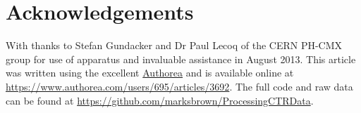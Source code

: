 \section*{Acknowledgements}
With thanks to Stefan Gundacker and Dr Paul Lecoq of the CERN PH-CMX group for use of apparatus and invaluable assistance in August 2013. This article was written using the excellent \href{www.authorea.com}{Authorea} and is available online at \href{https://www.authorea.com/users/695/articles/3692}{https://www.authorea.com/users/695/articles/3692}. The full code and raw data can be found at \href{https://github.com/marksbrown/ProcessingCTRData}{https://github.com/marksbrown/ProcessingCTRData}.